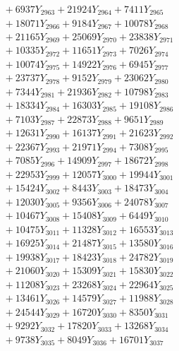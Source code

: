 \documentclass[a4paper,10pt]{article}
\begin{document}
{\begin{align}
&\;  + 6937 Y_{2963} + 21924 Y_{2964} + 7411 Y_{2965} \\[0.3ex]
&\;  + 18071 Y_{2966} + 9184 Y_{2967} + 10078 Y_{2968} \\[0.5ex]\allowbreak
&\;  + 21165 Y_{2969} + 25069 Y_{2970} + 23838 Y_{2971} \\[0.3ex]
&\;  + 10335 Y_{2972} + 11651 Y_{2973} + 7026 Y_{2974} \\[0.3ex]
&\;  + 10074 Y_{2975} + 14922 Y_{2976} + 6945 Y_{2977} \\[0.3ex]
&\;  + 23737 Y_{2978} + 9152 Y_{2979} + 23062 Y_{2980} \\[0.3ex]
&\;  + 7344 Y_{2981} + 21936 Y_{2982} + 10798 Y_{2983} \\[0.3ex]
&\;  + 18334 Y_{2984} + 16303 Y_{2985} + 19108 Y_{2986} \\[0.3ex]
&\;  + 7103 Y_{2987} + 22873 Y_{2988} + 9651 Y_{2989} \\[0.3ex]
&\;  + 12631 Y_{2990} + 16137 Y_{2991} + 21623 Y_{2992} \\[0.3ex]
&\;  + 22367 Y_{2993} + 21971 Y_{2994} + 7308 Y_{2995} \\[0.3ex]
&\;  + 7085 Y_{2996} + 14909 Y_{2997} + 18672 Y_{2998} \\[0.5ex]\allowbreak
&\;  + 22953 Y_{2999} + 12057 Y_{3000} + 19944 Y_{3001} \\[0.3ex]
&\;  + 15424 Y_{3002} + 8443 Y_{3003} + 18473 Y_{3004} \\[0.3ex]
&\;  + 12030 Y_{3005} + 9356 Y_{3006} + 24078 Y_{3007} \\[0.3ex]
&\;  + 10467 Y_{3008} + 15408 Y_{3009} + 6449 Y_{3010} \\[0.3ex]
&\;  + 10475 Y_{3011} + 11328 Y_{3012} + 16553 Y_{3013} \\[0.3ex]
&\;  + 16925 Y_{3014} + 21487 Y_{3015} + 13580 Y_{3016} \\[0.3ex]
&\;  + 19938 Y_{3017} + 18423 Y_{3018} + 24782 Y_{3019} \\[0.3ex]
&\;  + 21060 Y_{3020} + 15309 Y_{3021} + 15830 Y_{3022} \\[0.3ex]
&\;  + 11208 Y_{3023} + 23268 Y_{3024} + 22964 Y_{3025} \\[0.3ex]
&\;  + 13461 Y_{3026} + 14579 Y_{3027} + 11988 Y_{3028} \\[0.5ex]\allowbreak
&\;  + 24544 Y_{3029} + 16720 Y_{3030} + 8350 Y_{3031} \\[0.3ex]
&\;  + 9292 Y_{3032} + 17820 Y_{3033} + 13268 Y_{3034} \\[0.3ex]
&\;  + 9738 Y_{3035} + 8049 Y_{3036} + 16701 Y_{3037} \\[0.3ex]

\end{align}}
\end{document}

